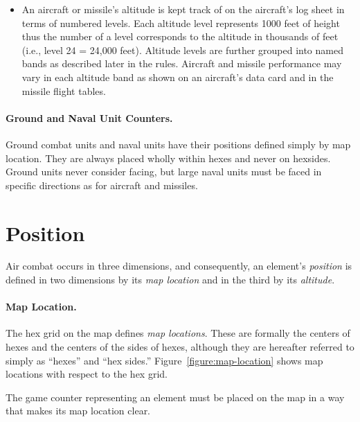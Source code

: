 {\begin{itemize}
    \item {} 
    An aircraft or missile's altitude is kept track of on the aircraft's log sheet in terms of numbered levels. Each altitude level represents 1000 feet of height thus the number of a level corresponds to the altitude in thousands of feet (i.e., level 24 = 24,000 feet). Altitude levels are further grouped into named bands as described later in the rules. Aircraft and missile performance may vary in each altitude band as shown on an aircraft's data card and in the missile flight tables.

\end{itemize}



\paragraph{Ground and Naval Unit Counters.}
Ground combat units and naval units have their positions defined simply by map location. They are always placed wholly within hexes and never on hexsides. Ground units never consider facing, but large naval units must be faced in specific directions as for aircraft and missiles.

}{

\section{Position}
\label{rule:position}

Air combat occurs in three dimensions, and consequently, an element’s \emph{position} is defined in two dimensions by its \emph{map location} and in the third by its \emph{altitude}.

\paragraph{Map Location.}
\label{rule:map-location}

The hex grid on the map defines \emph{map locations}. These are formally the centers of hexes and the centers of the sides of hexes, although they are hereafter referred to simply as “hexes” and “hex sides.” Figure~\ref{figure:map-location} shows map locations with respect to the hex grid.

The game counter representing an element must be placed on the map in a way that makes its map location clear. 

}
